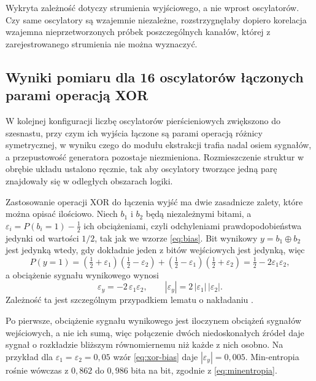Wykryta zależność dotyczy strumienia wyjściowego, a nie wprost oscylatorów. Czy same
oscylatory są wzajemnie niezależne, rozstrzygnęłaby dopiero korelacja wzajemna
nieprzetworzonych próbek poszczególnych kanałów, której z zarejestrowanego strumienia
nie można wyznaczyć.

\FloatBarrier

\subsection{Wyniki pomiaru dla 16 oscylatorów łączonych parami operacją XOR}

W kolejnej konfiguracji liczbę oscylatorów pierścieniowych zwiększono do szesnastu,
przy czym ich wyjścia łączone są parami operacją różnicy symetrycznej, w wyniku czego
do modułu ekstrakcji trafia nadal osiem sygnałów, a przepustowość generatora pozostaje
niezmieniona. Rozmieszczenie struktur w obrębie układu ustalono ręcznie, tak aby
oscylatory tworzące jedną parę znajdowały się w odległych obszarach logiki.

Zastosowanie operacji XOR do łączenia wyjść ma dwie zasadnicze zalety, które można
opisać ilościowo. Niech $b_1$ i $b_2$ będą niezależnymi bitami, a
$\varepsilon_i = P(b_i = 1) - \tfrac12$ ich obciążeniami, czyli odchyleniami
prawdopodobieństwa jedynki od wartości $1/2$, tak jak we wzorze \eqref{eq:bias}.
Bit wynikowy $y = b_1 \oplus b_2$ jest jedynką wtedy, gdy dokładnie jeden z bitów
wejściowych jest jedynką, więc
%
\begin{equation}
  P(y = 1)
  = \left(\tfrac12 + \varepsilon_1\right)\left(\tfrac12 - \varepsilon_2\right)
  + \left(\tfrac12 - \varepsilon_1\right)\left(\tfrac12 + \varepsilon_2\right)
  = \tfrac12 - 2\varepsilon_1\varepsilon_2 ,
  \label{eq:xor-p}
\end{equation}
%
a obciążenie sygnału wynikowego wynosi
%
\begin{equation}
  \varepsilon_y = -2\,\varepsilon_1\varepsilon_2 ,
  \qquad
  |\varepsilon_y| = 2\,|\varepsilon_1|\,|\varepsilon_2| .
  \label{eq:xor-bias}
\end{equation}
%
Zależność ta jest szczególnym przypadkiem lematu o nakładaniu
\cite{matsui1993linear}.

Po pierwsze, obciążenie sygnału wynikowego jest iloczynem obciążeń sygnałów
wejściowych, a nie ich sumą, więc połączenie dwóch niedoskonałych źródeł daje sygnał
o rozkładzie bliższym równomiernemu niż każde z nich osobno. Na przykład dla
$\varepsilon_1 = \varepsilon_2 = 0{,}05$ wzór \eqref{eq:xor-bias} daje
$|\varepsilon_y| = 0{,}005$. Min-entropia rośnie wówczas z $0{,}862$ do $0{,}986$
bita na bit, zgodnie z \eqref{eq:minentropia}.

